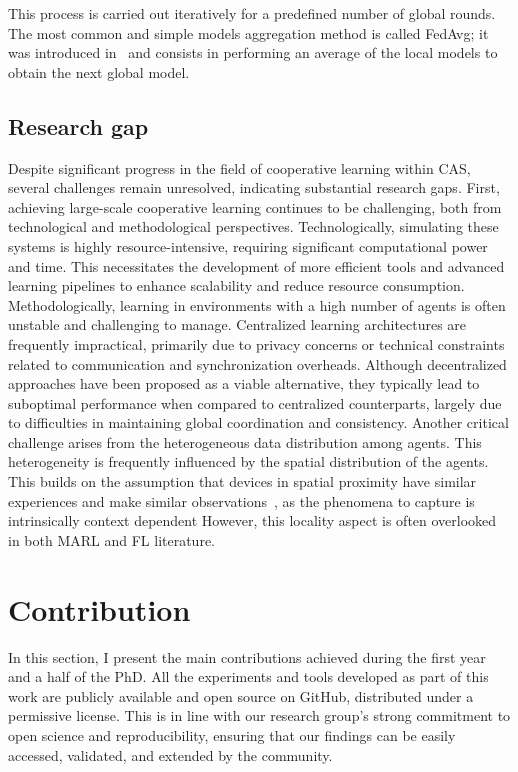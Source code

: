 \documentclass[12pt]{article}
\begin{document}
%
This process is carried out iteratively for a predefined number of global rounds. The most common and simple models
 aggregation method is called FedAvg; it was introduced in~\cite{DBLP:conf/aistats/McMahanMRHA17}
 and consists in performing an average of the local models to obtain the next global model.

\subsection{Research gap}

Despite significant progress in the field of cooperative learning within CAS, 
 several challenges remain unresolved, indicating substantial research gaps.
%
First, achieving large-scale cooperative learning continues to be challenging, both from technological 
 and methodological perspectives. 
% 
Technologically, simulating these systems is highly resource-intensive, requiring significant 
 computational power and time. 
% 
This necessitates the development of more efficient tools and advanced learning pipelines to enhance 
 scalability and reduce resource consumption.
%
Methodologically, learning in environments with a high number of agents is often unstable and challenging to manage. 
%
Centralized learning architectures are frequently impractical, primarily due to privacy concerns or technical 
 constraints related to communication and synchronization overheads. 
% 
Although decentralized approaches have been proposed as a viable alternative, they typically lead to 
 suboptimal performance when compared to centralized counterparts, largely due to difficulties in maintaining global 
 coordination and consistency.
%
Another critical challenge arises from the heterogeneous data distribution among agents.
% 
This heterogeneity is frequently influenced by the spatial distribution of the agents.
%
This builds on the assumption that devices in spatial proximity have similar experiences and make similar 
 observations~\cite{esterle2022deep}, as
 the phenomena to capture is intrinsically context dependent
% 
However, this locality aspect is often overlooked in both MARL and FL literature.


\section{Contribution}\label{sec:contribution}

In this section, I present the main contributions achieved during the first year and a half of the PhD. 
%
All the experiments and tools developed as part of this work are publicly available and open source on GitHub, 
 distributed under a permissive license. 
% 
This is in line with our research group's strong commitment to open science and reproducibility, ensuring that 
 our findings can be easily accessed, validated, and extended by the community.
\end{document}
